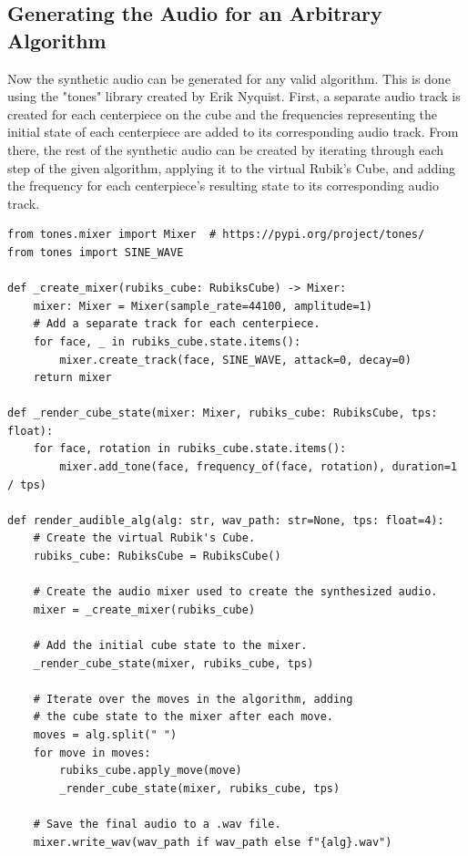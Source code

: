 \subsection{Generating the Audio for an Arbitrary Algorithm}
\label{subsec:generate-audible-algorithm}
Now the synthetic audio can be generated for any valid algorithm.
This is done using the "tones" library \cite{pip-tones} created by Erik Nyquist.
First, a separate audio track is created for each centerpiece on the cube and the frequencies representing the initial state of each centerpiece are added to its corresponding audio track.
From there, the rest of the synthetic audio can be created by iterating through each step of the given algorithm, applying it to the virtual Rubik's Cube, and adding the frequency for each centerpiece's resulting state to its corresponding audio track.

\begin{verbatim}
from tones.mixer import Mixer  # https://pypi.org/project/tones/
from tones import SINE_WAVE
    
def _create_mixer(rubiks_cube: RubiksCube) -> Mixer:
    mixer: Mixer = Mixer(sample_rate=44100, amplitude=1)
    # Add a separate track for each centerpiece.
    for face, _ in rubiks_cube.state.items():
        mixer.create_track(face, SINE_WAVE, attack=0, decay=0)
    return mixer

def _render_cube_state(mixer: Mixer, rubiks_cube: RubiksCube, tps: float):
    for face, rotation in rubiks_cube.state.items():
        mixer.add_tone(face, frequency_of(face, rotation), duration=1 / tps)

def render_audible_alg(alg: str, wav_path: str=None, tps: float=4):
    # Create the virtual Rubik's Cube.
    rubiks_cube: RubiksCube = RubiksCube()
    
    # Create the audio mixer used to create the synthesized audio.
    mixer = _create_mixer(rubiks_cube)
    
    # Add the initial cube state to the mixer.
    _render_cube_state(mixer, rubiks_cube, tps)
    
    # Iterate over the moves in the algorithm, adding
    # the cube state to the mixer after each move.
    moves = alg.split(" ")
    for move in moves:
        rubiks_cube.apply_move(move)
        _render_cube_state(mixer, rubiks_cube, tps)
    
    # Save the final audio to a .wav file.
    mixer.write_wav(wav_path if wav_path else f"{alg}.wav")
\end{verbatim}

